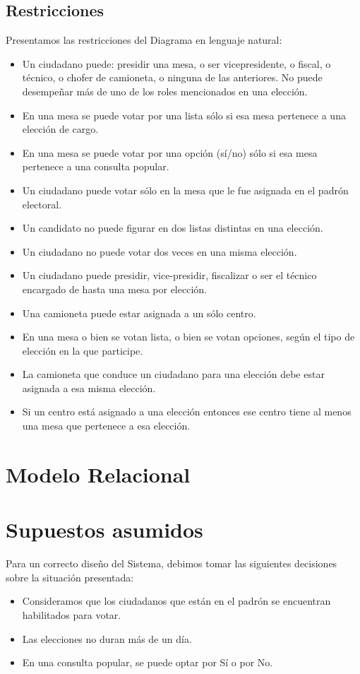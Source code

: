 \documentclass[10pt,a4paper]{article}
\begin{document}
\subsection{Restricciones}
Presentamos las restricciones del Diagrama en lenguaje natural:
\begin{itemize}
\item Un ciudadano puede: presidir una mesa, o ser vicepresidente, o fiscal, o técnico, o chofer de camioneta, o ninguna de las anteriores. No puede desempeñar más de uno de los roles mencionados en una elección.
\item En una mesa se puede votar por una lista sólo si esa mesa pertenece a una elección de cargo.
\item En una mesa se puede votar por una opción (sí/no) sólo si esa mesa pertenece a una consulta popular.
\item Un ciudadano puede votar sólo en la mesa que le fue asignada en el padrón electoral.
\item Un candidato no puede figurar en dos listas distintas en una elección.
\item Un ciudadano no puede votar dos veces en una misma elección.
\item Un ciudadano puede presidir, vice-presidir, fiscalizar o ser el técnico encargado de hasta una mesa por elección.
\item Una camioneta puede estar asignada a un sólo centro.
\item En una mesa o bien se votan lista, o bien se votan opciones, según el tipo de elección en la que participe.
\item La camioneta que conduce un ciudadano para una elección debe estar asignada a esa misma elección.
\item Si un centro está asignado a una elección entonces ese centro tiene al menos una mesa que pertenece a esa elección.

\end{itemize}
\newpage
\section{Modelo Relacional}

\newpage
\section{Supuestos asumidos}
Para un correcto diseño del Sistema, debimos tomar las siguientes decisiones sobre la situación presentada:
\begin{itemize}
\item Consideramos que los ciudadanos que están en el padrón se encuentran habilitados para votar.
\item Las elecciones no duran más de un día.
\item En una consulta popular, se puede optar por Sí o por No.
\end{itemize}
\end{document}
